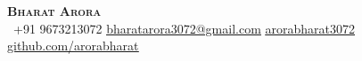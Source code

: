 \begin{center}
    \textbf{\Huge \scshape Bharat Arora} \\ \vspace{1pt}
     \ \small +91 9673213072 \quad
    \href{mailto:fibharatarora3072stlast@gmail.com}{ \underline{bharatarora3072@gmail.com}} \quad
    \href{https://www.linkedin.com/in/arorabharat3072}{ \underline{arorabharat3072}} \quad
    \href{https://github.com/arorabharat}{ \underline{github.com/arorabharat}}
\end{center}